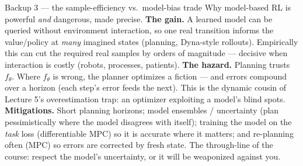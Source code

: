 \documentclass[10pt, aspectratio=169]{beamer}
\begin{document}
\begin{frame}{Backup 3 --- the sample-efficiency vs.\ model-bias trade}
\footnotesize
Why model-based RL is powerful \emph{and} dangerous, made precise.
\medskip
\textbf{The gain.} A learned model can be queried without environment interaction, so one real transition informs the value/policy at \emph{many} imagined states (planning, Dyna-style rollouts). Empirically this can cut the required real samples by orders of magnitude --- decisive when interaction is costly (robots, processes, patients).
\medskip
\textbf{The hazard.} Planning trusts $f_\theta$. Where $f_\theta$ is wrong, the planner optimizes a fiction --- and errors \alert{compound} over a horizon (each step's error feeds the next). This is the dynamic cousin of Lecture 5's overestimation trap: an optimizer exploiting a model's blind spots.
\medskip
\textbf{Mitigations.} Short planning horizons; model ensembles / uncertainty (plan pessimistically where the model disagrees with itself); training the model on the \emph{task} loss (differentiable MPC) so it is accurate where it matters; and re-planning often (MPC) so errors are corrected by fresh state. The through-line of the course: \alert{respect the model's uncertainty, or it will be weaponized against you.}
\end{frame}
\end{document}
